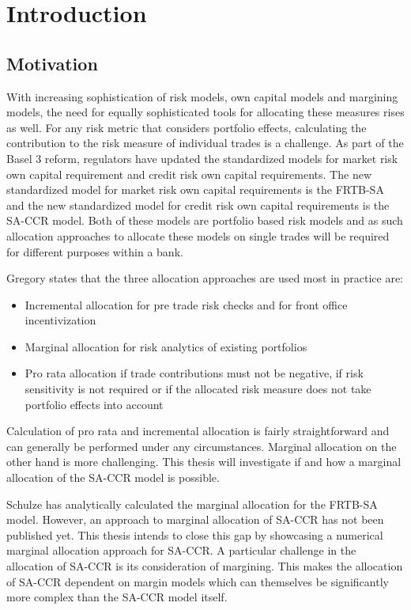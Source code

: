 \documentclass[../Thesis_AHoecherl.tex]{subfiles}
\begin{document}
    \chapter{Introduction}
    \section{Motivation}
    With increasing sophistication of risk models, own capital models and margining models, the need for equally sophisticated tools for allocating these measures rises as well. For any risk metric that considers portfolio effects, calculating the contribution to the risk measure of individual trades is a challenge. As part of the Basel 3 reform, regulators have updated the standardized models for market risk own capital requirement and credit risk own capital requirements. The new standardized model for market risk own capital requirements is the \gls{FRTB-SA} and the new standardized model for credit risk own capital requirements is the \gls{SA-CCR} model. Both of these models are portfolio based risk models and as such allocation approaches to allocate these models on single trades will be required for different purposes within a bank. 
    
    Gregory \cite[Chapter~10.7]{gregory2015xva} states that the three allocation approaches are used most in practice are:

    \begin{itemize}
        \item Incremental allocation for pre trade risk checks and for front office incentivization  
        \item Marginal allocation for risk analytics of existing portfolios 
        \item Pro rata allocation if trade contributions must not be negative, if risk sensitivity is not required or if the allocated risk measure does not take portfolio effects into account
    \end{itemize}

    Calculation of pro rata and incremental allocation is fairly straightforward and can generally be performed under any circumstances. Marginal allocation on the other hand is more challenging. This thesis will investigate if and how a marginal allocation of the \gls{SA-CCR} model is possible.

    Schulze \cite{schulze2018capital} has analytically calculated the marginal allocation for the FRTB-SA model. However, an approach to marginal allocation of \gls{SA-CCR} has not been published yet. This thesis intends to close this gap by showcasing a numerical marginal allocation approach for \gls{SA-CCR}. A particular challenge in the allocation of \gls{SA-CCR} is its consideration of margining. This makes the allocation of \gls{SA-CCR} dependent on margin models which can themselves be significantly more complex than the \gls{SA-CCR} model itself.
\end{document}
